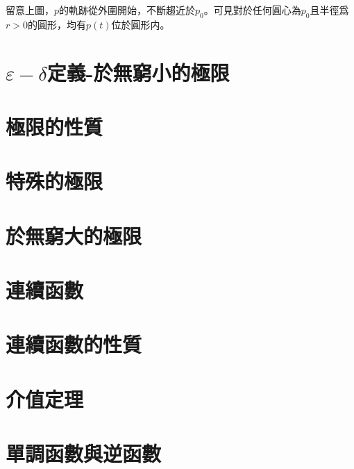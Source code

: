 \documentclass[12pt]{article}
\begin{document}
    留意上圖，$p$的軌跡從外圍開始，不斷趨近於$p_0$。可見對於任何圓心為$p_0$且半徑爲$r>0$的圓形，均有$p(t)$位於圓形内。

    \section*{$\varepsilon-\delta$定義-於無窮小的極限}
    \section*{極限的性質}
    \section*{特殊的極限}
    \section*{於無窮大的極限}
    \section*{連續函數}
    \section*{連續函數的性質}
    \section*{介值定理}
    \section*{單調函數與逆函數}
\end{document}
